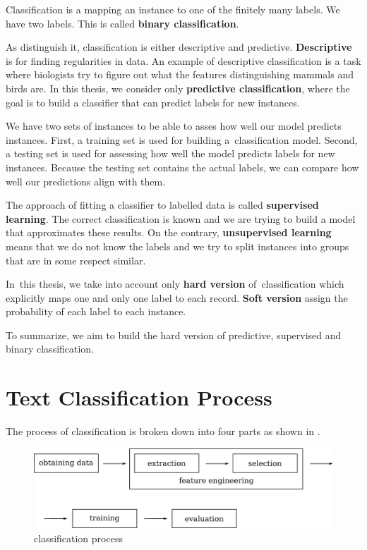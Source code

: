Classification is a mapping an instance to one of the finitely many labels.
We have two labels.
This is called \textbf{binary classification}.

As \citet{TanBachKum08} distinguish it, classification is either descriptive and predictive.
\textbf{Descriptive} is for finding regularities in data.
An example of descriptive classification is a task where
biologists try to figure out what the features distinguishing mammals and birds are.
In this thesis, we consider only \textbf{predictive classification}, where the goal is to build a classifier
that can predict labels for new instances.

We have two sets of instances to be able to asses how well our model predicts instances.
First, a training set is  used for building a~classification model.
Second, a testing set is used for assessing how well the model predicts labels for new instances.
Because the testing set contains the actual labels, we can compare how well our predictions align with them.

The approach of fitting a classifier to labelled data is called \textbf{supervised learning}.
The correct classification is known and we are trying to build a model that approximates these results.
On the contrary, \textbf{unsupervised learning} means that we do not know the labels and we try to split instances into groups that are in some respect similar.

In~this thesis, we take into account only \textbf{hard version} of~classification which explicitly maps one and only one label to each record.  
\textbf{Soft version} assign the probability of each label to each instance.

To summarize, we aim to build the hard version of predictive, supervised and binary classification.

\section{Text Classification Process}


The process of classification is broken down into four parts as shown in .

\begin{figure}[h]
	\centering
	\includegraphics[width=12cm]{figures/clsf_process.eps}
	\caption{classification process}\label{fig:clsf_process}
\end{figure}

